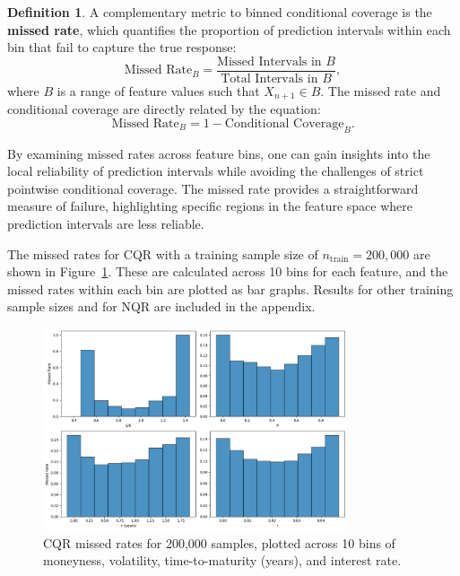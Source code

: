 \documentclass{article}
\theoremstyle{definition}
\newtheorem{definition}{Definition}
\begin{document}
\begin{definition}
A complementary metric to binned conditional coverage is the \textbf{missed rate}, which quantifies the proportion of prediction intervals within each bin that fail to capture the true response:
\begin{equation}
\text{Missed Rate}_B = \frac{\text{Missed Intervals in } B}{\text{Total Intervals in } B},
\end{equation}
where $B$ is a range of feature values such that $X_{n+1} \in B$. The missed rate and conditional coverage are directly related by the equation:
\begin{equation}
\text{Missed Rate}_B = 1 - \text{Conditional Coverage}_B.
\end{equation}
\end{definition}

By examining missed rates across feature bins, one can gain insights into the local reliability of prediction intervals while avoiding the challenges of strict pointwise conditional coverage. The missed rate provides a straightforward measure of failure, highlighting specific regions in the feature space where prediction intervals are less reliable.

The missed rates for CQR with a training sample size of $n_{\text{train}} = 200,000$ are shown in Figure~\ref{fig:CQR_MISSED_RATE_5}. These are calculated across 10 bins for each feature, and the missed rates within each bin are plotted as bar graphs. Results for other training sample sizes and for NQR are included in the appendix.

\begin{figure}[h]
    \centering
    \includegraphics[width=0.8\textwidth]{reports/figures/3.3-nm-figures/sample_5/CQR_MISSED_RATE_5.png}
    \caption{CQR missed rates for 200,000 samples, plotted across 10 bins of moneyness, volatility, time-to-maturity (years), and interest rate.}
    \label{fig:CQR_MISSED_RATE_5}
\end{figure}
\end{document}
